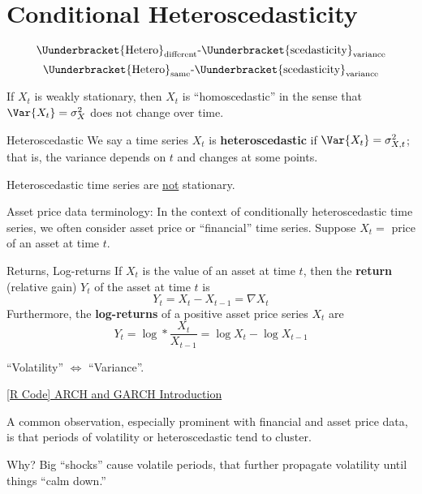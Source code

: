 \section{Conditional Heteroscedasticity}
\[ \Uunderbracket{\text{Hetero}}_{\text{different}}\text{-}\Uunderbracket{\text{scedasticity}}_{\text{variance}} \]
\[ \Uunderbracket{\text{Hetero}}_{\text{same}}\text{-}\Uunderbracket{\text{scedasticity}}_{\text{variance}} \]
\begin{Example}{}{}
    If $ X_t $ is weakly stationary, then $ X_t $ is ``homoscedastic''
    in the sense that $ \Var{X_t}=\sigma_X^2 $ does not change over time.
\end{Example}
\begin{Definition}{Heteroscedastic}{}
    We say a time series $ X_t $ is \textbf{heteroscedastic}
    if $ \Var{X_t}=\sigma_{X,t}^2 $; that is, the variance
    depends on $ t $ and changes at some points.
\end{Definition}
\begin{Remark}{}{}
    Heteroscedastic time series are \underline{not} stationary.
\end{Remark}
Asset price data terminology: In the context of conditionally
heteroscedastic time series, we often consider asset price or ``financial''
time series. Suppose $ X_t= $ price of an asset at time $ t $.
\begin{Definition}{Returns, Log-returns}{}
    If $ X_t $ is the value of an asset at time $ t $, then
    the \textbf{return} (relative gain) $ Y_t $ of the
    asset at time $ t $ is
    \[ Y_t=X_t-X_{t-1}=\nabla X_t \]
    Furthermore, the \textbf{log-returns}
    of a positive asset price series $ X_t $
    are
    \[ Y_t=\log*{\frac{X_t}{X_{t-1}}}=\log{X_t}-\log{X_{t-1}} \]
\end{Definition}
\begin{Remark}{}{}
    ``Volatility'' $ \iff $ ``Variance''.
\end{Remark}
\href{https://github.com/Hextical/university-notes/blob/master/year-3/semester-2/STAT 443/code/8.3 - ARCH and GARCH Introduction.R}{[R Code] ARCH and GARCH Introduction}

A common observation, especially prominent with financial and asset
price data, is that periods of volatility or heteroscedastic
tend to cluster.

Why? Big ``shocks'' cause volatile periods, that further propagate
volatility until things ``calm down.''


